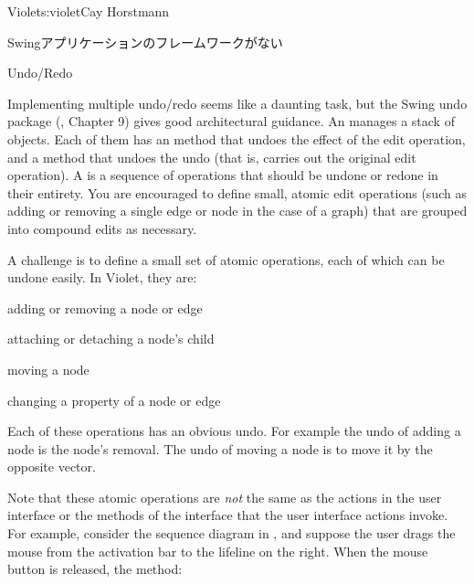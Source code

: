 \begin{aosachapter}{Violet}{s:violet}{Cay Horstmann}
\begin{aosasect1}{Swingアプリケーションのフレームワークがない}
\end{aosasect1}

\begin{aosasect1}{Undo/Redo}

Implementing multiple undo/redo seems like a daunting task, but the
Swing undo package (\cite{bib:topley:coreswing}, Chapter 9) gives good
architectural guidance. An  manages a stack of
 objects. Each of them has an  method
that undoes the effect of the edit operation, and a  method
that undoes the undo (that is, carries out the original edit
operation). A  is a sequence of 
operations that should be undone or redone in their entirety. You are
encouraged to define small, atomic edit operations (such as adding or
removing a single edge or node in the case of a graph) that are
grouped into compound edits as necessary.

A challenge is to define a small set of atomic operations, each of
which can be undone easily. In Violet, they are:

\begin{aosaitemize}

  \item adding or removing a node or edge

  \item attaching or detaching a node's child

  \item moving a node

  \item changing a property of a node or edge

\end{aosaitemize}

Each of these operations has an obvious undo. For example the undo of
adding a node is the node's removal. The undo of moving a node is to
move it by the opposite vector.


Note that these atomic operations are \emph{not} the same as the
actions in the user interface or the methods of the 
interface that the user interface actions invoke. For example,
consider the sequence diagram in ,
and suppose the user drags the mouse from the activation bar to the
lifeline on the right. When the mouse button is released, the method:


\end{aosasect1}
\end{aosachapter}
